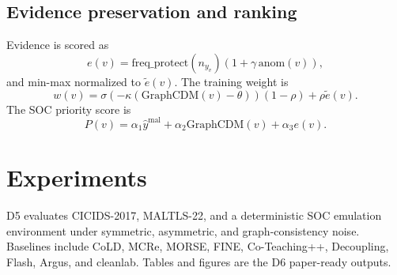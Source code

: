 \documentclass[conference]{IEEEtran}
\newcommand{\gcdm}{\mathrm{GraphCDM}}
\newcommand{\ypred}{\hat{y}}
\newcommand{\mal}{\mathrm{mal}}
\begin{document}
\subsection{Evidence preservation and ranking}
Evidence is scored as
\begin{equation}
e(v)=\mathrm{freq\_protect}(n_{y_v})(1+\gamma\,\mathrm{anom}(v)),
\end{equation}
and min-max normalized to $\tilde{e}(v)$. The training weight is
\begin{equation}
w(v)=\sigma(-\kappa(\gcdm(v)-\theta))(1-\rho)+\rho\tilde{e}(v).
\end{equation}
The SOC priority score is
\begin{equation}
P(v)=\alpha_1\ypred^\mal+\alpha_2\gcdm(v)+\alpha_3e(v).
\end{equation}

\section{Experiments}
D5 evaluates CICIDS-2017, MALTLS-22, and a deterministic SOC emulation environment under symmetric, asymmetric, and graph-consistency noise. Baselines include CoLD, MCRe, MORSE, FINE, Co-Teaching++, Decoupling, Flash, Argus, and cleanlab. Tables and figures are the D6 paper-ready outputs.

\begin{table}[t]
\centering
\caption{Main results from D6 Table 1.}
\label{tab:main}
\end{table}
\end{document}
